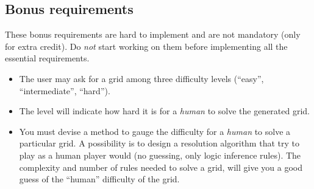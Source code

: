 \documentclass{exercices}
\renewcommand{\|}{\url|}
\begin{document}
\subsection{Bonus requirements}
These bonus requirements are hard to implement and are not mandatory (only for
extra credit). Do \emph{not} start working on them before implementing all the essential requirements. 

\begin{itemize}
  \item The user may ask for a grid among three difficulty levels (``easy'',
    ``intermediate'', ``hard'').
  \item The level will indicate how hard it is for a \emph{human} to solve the
    generated grid. 
  \item You must devise a method to gauge the difficulty for a \emph{human} to
    solve a particular grid. A possibility is to design a resolution algorithm 
    that try to play as a human player would (no guessing, 
    only logic inference rules). The complexity and number of rules needed to 
    solve a grid, will give you a good guess of the ``human'' difficulty of the grid.
\end{itemize}
\end{document}
